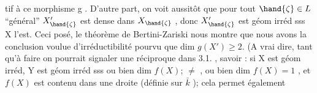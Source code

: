 tif à ce morphisme  g . D'autre part, on voit aussitôt que pour tout
$\hand{\zeta}\in L$  ``général''  $X'_{\hand{\zeta}}$ est dense dans $X_{\hand{\zeta}}$ , donc  $X'_{\hand{\zeta}}$  est géom irréd sss
X  l'est.  Ceci posé,  le théorème de Bertini-Zariski nous montre que
nous avons la conclusion voulue  d'irréductibilité pourvu que
dim $g(X') \geqslant 2$. (A vrai dire, tant qu'à faire on pourrait signaler une
réciproque dans 3.1. , savoir :  si X est géom irréd, Y  est
géom irréd sss  ou bien  dim $f(X)$; $\neq$ , ou bien  dim $f(X)=1$ , et $f(X)$
est contenu dans une droite (définie sur $\bar{k}$ )\hand{)}; cela permet également

